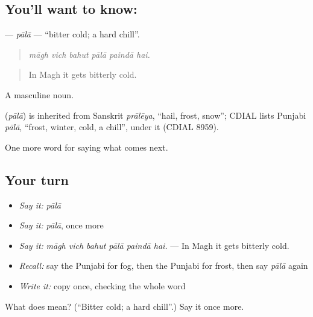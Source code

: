 \subsection*{You'll want to know: }
\textbf{} — \emph{pālā} — \textquotedblleft{}bitter cold; a hard chill\textquotedblright{}.

\begin{quote}
     
\end{quote}

\begin{quote}
\emph{māgh vich bahut pālā paindā hai.}
\end{quote}

\begin{quote}
In Magh it gets bitterly cold.
\end{quote}

A masculine noun.

\begin{cousinweb}
\textbf{} (\emph{pālā}) is inherited from Sanskrit \emph{prālēya}, \textquotedblleft{}hail, frost, snow\textquotedblright{}; CDIAL lists Punjabi \emph{pālā}, \textquotedblleft{}frost, winter, cold, a chill\textquotedblright{}, under it (CDIAL 8959).
\end{cousinweb}

\begin{grammarlens}[title={What you've built}]
One more word for saying what comes next.
\end{grammarlens}

\subsection*{Your turn}
\begin{itemize}
\raggedright
  \item \emph{Say it:} \emph{pālā}
  \item \emph{Say it:} \emph{pālā}, once more
  \item \emph{Say it:} \emph{māgh vich bahut pālā paindā hai.} — In Magh it gets bitterly cold.
  \item \emph{Recall:} say the Punjabi for fog, then the Punjabi for frost, then say \emph{pālā} again
  \item \emph{Write it:} copy \textbf{} once, checking the whole word
\end{itemize}

\begin{tcolorbox}[breakable,colback=teal!4,colframe=teal!35!black,title={Before you move on}]
What does  mean? (\textquotedblleft{}Bitter cold; a hard chill\textquotedblright{}.) Say it once more.
\end{tcolorbox}
